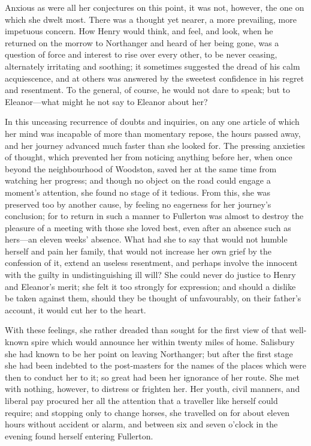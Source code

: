  Anxious as were all her conjectures on this point, it was not, however, the one on which she dwelt most. There was a thought yet nearer, a more prevailing, more impetuous concern. How Henry would think, and feel, and look, when he returned on the morrow to Northanger and heard of her being gone, was a question of force and interest to rise over every other, to be never ceasing, alternately irritating and soothing; it sometimes suggested the dread of his calm acquiescence, and at others was answered by the sweetest confidence in his regret and resentment. To the general, of course, he would not dare to speak; but to Eleanor—what might he not say to Eleanor about her? 

 In this unceasing recurrence of doubts and inquiries, on any one article of which her mind was incapable of more than momentary repose, the hours passed away, and her journey advanced much faster than she looked for. The pressing anxieties of thought, which prevented her from noticing anything before her, when once beyond the neighbourhood of Woodston, saved her at the same time from watching her progress; and though no object on the road could engage a moment's attention, she found no stage of it tedious. From this, she was preserved too by another cause, by feeling no eagerness for her journey's conclusion; for to return in such a manner to Fullerton was almost to destroy the pleasure of a meeting with those she loved best, even after an absence such as hers—an eleven weeks' absence. What had she to say that would not humble herself and pain her family, that would not increase her own grief by the confession of it, extend an useless resentment, and perhaps involve the innocent with the guilty in undistinguishing ill will? She could never do justice to Henry and Eleanor's merit; she felt it too strongly for expression; and should a dislike be taken against them, should they be thought of unfavourably, on their father's account, it would cut her to the heart. 

 With these feelings, she rather dreaded than sought for the first view of that well-known spire which would announce her within twenty miles of home. Salisbury she had known to be her point on leaving Northanger; but after the first stage she had been indebted to the post-masters for the names of the places which were then to conduct her to it; so great had been her ignorance of her route. She met with nothing, however, to distress or frighten her. Her youth, civil manners, and liberal pay procured her all the attention that a traveller like herself could require; and stopping only to change horses, she travelled on for about eleven hours without accident or alarm, and between six and seven o'clock in the evening found herself entering Fullerton. 

